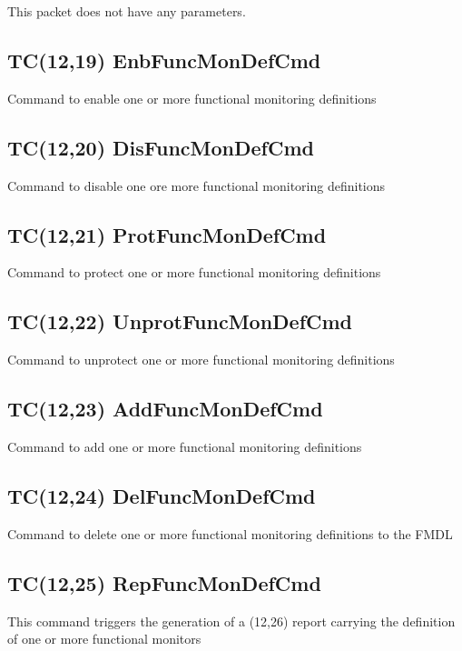 This packet does not have any parameters.

\pagebreak
\subsection{TC(12,19) EnbFuncMonDefCmd}
Command to enable one or more functional monitoring definitions

\pagebreak
\subsection{TC(12,20) DisFuncMonDefCmd}
Command to disable one ore more functional monitoring definitions

\pagebreak
\subsection{TC(12,21) ProtFuncMonDefCmd}
Command to protect one or more functional monitoring definitions

\pagebreak
\subsection{TC(12,22) UnprotFuncMonDefCmd}
Command to unprotect one or more functional monitoring definitions

\pagebreak
\subsection{TC(12,23) AddFuncMonDefCmd}
Command to add one or more functional monitoring definitions

\pagebreak
\subsection{TC(12,24) DelFuncMonDefCmd}
Command to delete one or more functional monitoring definitions to the FMDL

\pagebreak
\subsection{TC(12,25) RepFuncMonDefCmd}
This command triggers the generation of a (12,26) report carrying the definition of one or more functional monitors

